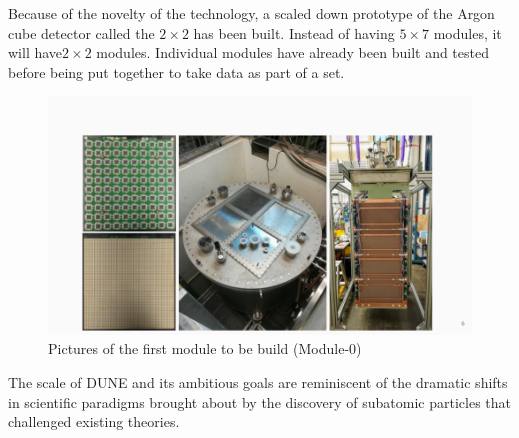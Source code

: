 Because of the novelty of the technology, a scaled down prototype  of the Argon cube detector called the $2 \times 2$ has been built.
Instead of having $5 \times7$ modules, it will have$2 \times 2$ modules.
Individual modules have already been built and tested before being put together to take data as part of a set.

\begin{figure}[H]
  \centering
  \includegraphics[width=120mm]{figures/ndPic.png}
  \caption{Pictures of the first module to be build (Module-0)}
  \label{ndPic}
\end{figure}

The scale of DUNE and its ambitious goals are reminiscent of the dramatic shifts in scientific paradigms brought about by the discovery of subatomic particles that challenged existing theories.




